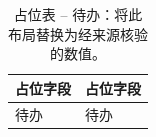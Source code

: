 \begin{table}[t]
  \centering
  \caption{占位表 -- 待办：将此布局替换为经来源核验的数值。}
  \label{tab:placeholder-layout}
  \begin{tabular}{p{}p{}}
    \hline
    占位字段 & 占位字段 \\
    \hline
    待办 & 待办 \\
    \hline
  \end{tabular}
\end{table}
